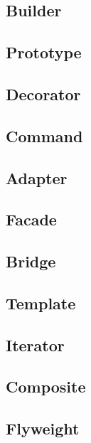 \documentclass[a4paper, 11pt]{article}
\begin{document}
    \subsection{Builder}

    \subsection{Prototype}

    \subsection{Decorator}

    \subsection{Command}

    \subsection{Adapter}

    \subsection{Facade}

    \subsection{Bridge}

    \subsection{Template}

    \subsection{Iterator}

    \subsection{Composite}

    \subsection{Flyweight}
\end{document}
